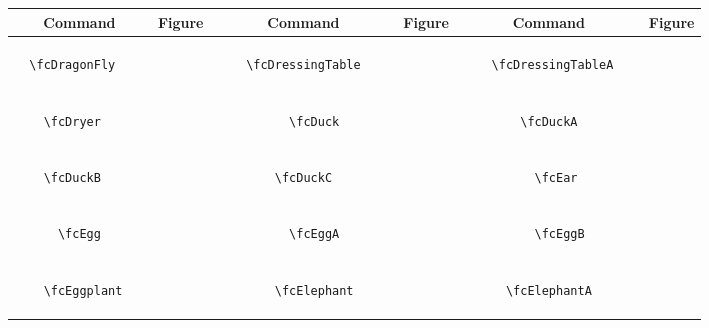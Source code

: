 \documentclass[x11names]{article}
\begin{document}
\begin{table}[H]\centering\begin{tabular}{|c|c|c|c|c|c|}\hline{\bf Command} & {\bf Figure} & {\bf Command} & {\bf Figure} & {\bf Command} & {\bf Figure}\\	\hline	&\multirow{5}{*}{	\fcDragonFly	[scale=0.4]} & &\multirow{5}{*}{	\fcDressingTable	[scale=0.4]} & &\multirow{5}{*}{	\fcDressingTableA	[scale=0.4]}\\	& & & & & \\	& & & & & \\	\verb|	\fcDragonFly	| & & \verb|	\fcDressingTable	| & & \verb|	\fcDressingTableA	| & \\	& & & & & \\	& & & & & \\	& & & & & \\	\hline									
		&\multirow{5}{*}{	\fcDryer	[scale=0.4]} & &\multirow{5}{*}{	\fcDuck	[scale=0.8]} & &\multirow{5}{*}{	\fcDuckA	[scale=0.8]}\\	& & & & & \\	& & & & & \\	\verb|	\fcDryer	| & & \verb|	\fcDuck	| & & \verb|	\fcDuckA	| & \\	& & & & & \\	& & & & & \\	& & & & & \\	\hline									
		&\multirow{5}{*}{	\fcDuckB	[scale=0.8]} & &\multirow{5}{*}{	\fcDuckC	[scale=0.2]} & &\multirow{5}{*}{	\fcEar	[scale=0.4]}\\	& & & & & \\	& & & & & \\	\verb|	\fcDuckB	| & & \verb|	\fcDuckC	| & & \verb|	\fcEar	| & \\	& & & & & \\	& & & & & \\	& & & & & \\	\hline									
		&\multirow{5}{*}{	\fcEgg	[scale=0.6]} & &\multirow{5}{*}{	\fcEggA	[scale=0.8]} & &\multirow{5}{*}{	\fcEggB	[scale=0.8]}\\	& & & & & \\	& & & & & \\	\verb|	\fcEgg	| & & \verb|	\fcEggA	| & & \verb|	\fcEggB	| & \\	& & & & & \\	& & & & & \\	& & & & & \\	\hline									
		&\multirow{5}{*}{	\fcEggplant	[scale=0.4]} & &\multirow{5}{*}{	\fcElephant	[scale=0.8]} & &\multirow{5}{*}{	\fcElephantA	[scale=0.8]}\\	& & & & & \\	& & & & & \\	\verb|	\fcEggplant	| & & \verb|	\fcElephant	| & & \verb|	\fcElephantA	| & \\	& & & & & \\	& & & & & \\	& & & & & \\	\hline									

\end{tabular}
\end{table}
\end{document}
